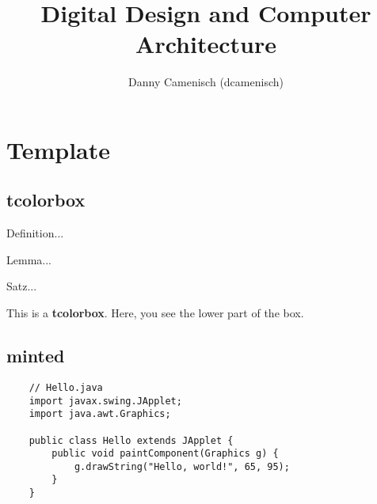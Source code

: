 \documentclass[a4paper]{report}
\title{Digital Design and Computer Architecture}
\author{Danny Camenisch (dcamenisch)}
\begin{document}
\maketitle
\tableofcontents



\chapter{Template}
\section{tcolorbox}

\begin{definition}
    Definition...
\end{definition}

\begin{lemma}
    Lemma...
\end{lemma}

\begin{satz}
    Satz...
\end{satz}

\begin{tcolorbox}[colback=dcWhite,colframe=dcOrange,title=\textbf{My Heading}]
    This is a \textbf{tcolorbox}.
\tcblower
    Here, you see the lower part of the box.
\end{tcolorbox}

\section{minted}

\begin{verbatim}
    // Hello.java
    import javax.swing.JApplet;
    import java.awt.Graphics;
    
    public class Hello extends JApplet {
        public void paintComponent(Graphics g) {
            g.drawString("Hello, world!", 65, 95);
        }    
    }
\end{verbatim}



%




\end{document}
